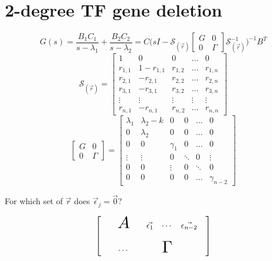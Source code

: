 \documentclass[a4paper, 11 pt]{article}
\newcommand\bigGamma{\scalebox{2}{$\Gamma$}}
\newcommand\bigA{\scalebox{2}{$A$}}
\begin{document}
   \section{2-degree TF gene deletion}
   \begin{equation}
     G(s) = \frac{B_{1} C_{1}}{s-\lambda_{1}} + \frac{B_{2} C_{2}}{s-\lambda_{2}} = C \Big(sI - \mathcal{S}_{(\vec{r})} \begin{bmatrix} G & 0 \\ 0 & \Gamma \end{bmatrix}  \mathcal{S}^{-1}_{(\vec{r})} \Big)^{-1} B^{T}
   \end{equation}
   \begin{equation}
     \mathcal{S}_{(\vec{r})} = \begin{bmatrix} 1 & 0 & 0 & \hdots & 0 \\ r_{1,1} & 1-r_{1,1} & r_{1,2} & \hdots & r_{1,n} \\ r_{2,1} & -r_{2,1} & r_{2,2} & \hdots & r_{2,n} \\ r_{3,1} & -r_{3,1} & r_{3,2} & \hdots & r_{3,n} \\ \vdots & \vdots & \vdots & \vdots & \vdots \\ r_{n,1} & -r_{n,1} & r_{n,2} & \hdots & r_{n,n} \end{bmatrix} 
   \end{equation}
       \begin{equation}
      \begin{bmatrix} G & 0 \\ 0 & \Gamma \end{bmatrix} =  \begin{bmatrix} \lambda_{1} & \lambda_{2} - k & 0 & 0 & \hdots & 0 \\ 0 & \lambda_{2} & 0 & 0 & \hdots & 0 \\ 0 & 0 & \gamma_{1} & 0 & \hdots & 0 \\ \vdots & \vdots & 0 & \ddots & 0 & \vdots \\ 0 & 0 & \vdots & 0 & \ddots & 0 \\ 0 & 0 & 0 & 0 & \hdots & \gamma_{n-2} \end{bmatrix}
   \end{equation}

   For which set of $\vec{r}$ does $\vec{\epsilon}_{j} = \vec{0}$?

   \begin{equation}
     \begin{bmatrix} && \bigA && \vec{\epsilon_{1}} & \cdots & \vec{\epsilon_{n-2}} \\ &&&& \\ && \cdots && & \bigGamma && \end{bmatrix} 
   \end{equation}
\end{document}
